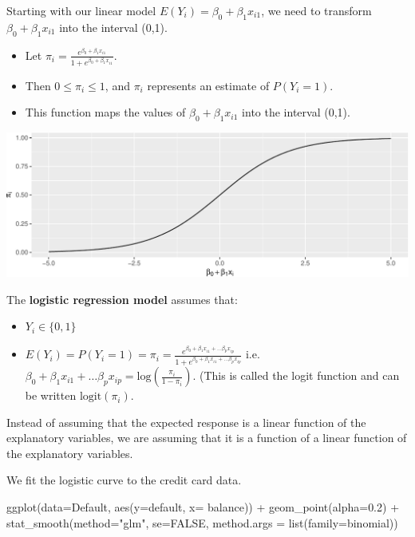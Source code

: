 \documentclass[
  letterpaper,
  DIV=11,
  numbers=noendperiod]{scrreprt}
\newenvironment{Shaded}{\begin{snugshade}}{\end{snugshade}}
\newcommand{\AttributeTok}[1]{\textcolor[rgb]{0.40,0.45,0.13}{#1}}
\newcommand{\ConstantTok}[1]{\textcolor[rgb]{0.56,0.35,0.01}{#1}}
\newcommand{\FloatTok}[1]{\textcolor[rgb]{0.68,0.00,0.00}{#1}}
\newcommand{\FunctionTok}[1]{\textcolor[rgb]{0.28,0.35,0.67}{#1}}
\newcommand{\NormalTok}[1]{\textcolor[rgb]{0.00,0.23,0.31}{#1}}
\newcommand{\SpecialCharTok}[1]{\textcolor[rgb]{0.37,0.37,0.37}{#1}}
\newcommand{\StringTok}[1]{\textcolor[rgb]{0.13,0.47,0.30}{#1}}
\providecommand{\tightlist}{%
  \setlength{\itemsep}{0pt}\setlength{\parskip}{0pt}}\usepackage{longtable,booktabs,array}
\begin{document}
Starting with our linear model \(E(Y_i) = \beta_0+\beta_1x_{i1}\), we
need to transform \(\beta_0+\beta_1x_{i1}\) into the interval (0,1).

\begin{itemize}
\item
  Let
  \(\pi_i = \frac{e^{\beta_0+\beta_1x_{i1} }}{1+e^{\beta_0+\beta_1x_{i1}}}\).
\item
  Then \(0 \leq \pi_i \leq 1\), and \(\pi_i\) represents an estimate of
  \(P(Y_i=1)\).
\item
  This function maps the values of \(\beta_0+\beta_1x_{i1}\) into the
  interval (0,1).
\end{itemize}

\includegraphics{Ch6_files/figure-pdf/unnamed-chunk-9-1.pdf}

The \textbf{logistic regression model} assumes that:\\

\begin{itemize}
\tightlist
\item
  \(Y_i \in \{0,1\}\)\\
\item
  \(E(Y_i) = P(Y_i=1) = \pi_i=\frac{e^{\beta_0+\beta_1x_{i1} + \ldots \beta_px_{ip}}}{1+e^{\beta_0+\beta_1x_{i1} + \ldots \beta_px_{ip}}}\)
  i.e.~\(\beta_0+\beta_1x_{i1} + \ldots \beta_px_{ip}= \text{log}\left(\frac{\pi_i}{1-\pi_i}\right).\)
  (This is called the logit function and can be written
  \(\text{logit}(\pi_i)\).
\end{itemize}

Instead of assuming that the expected response is a linear function of
the explanatory variables, we are assuming that it is a function of a
linear function of the explanatory variables.

We fit the logistic curve to the credit card data.

\begin{Shaded}
\begin{Highlighting}[]
\FunctionTok{ggplot}\NormalTok{(}\AttributeTok{data=}\NormalTok{Default, }\FunctionTok{aes}\NormalTok{(}\AttributeTok{y=}\NormalTok{default, }\AttributeTok{x=}\NormalTok{ balance)) }\SpecialCharTok{+} \FunctionTok{geom\_point}\NormalTok{(}\AttributeTok{alpha=}\FloatTok{0.2}\NormalTok{) }\SpecialCharTok{+} 
  \FunctionTok{stat\_smooth}\NormalTok{(}\AttributeTok{method=}\StringTok{"glm"}\NormalTok{, }\AttributeTok{se=}\ConstantTok{FALSE}\NormalTok{, }\AttributeTok{method.args =} \FunctionTok{list}\NormalTok{(}\AttributeTok{family=}\NormalTok{binomial)) }
\end{Highlighting}
\end{Shaded}
\end{document}
